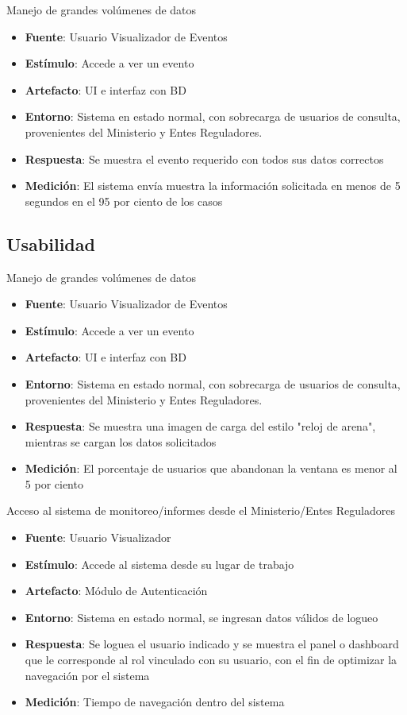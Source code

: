 Manejo de grandes volúmenes de datos
\begin{itemize}
\item {\bf Fuente}: Usuario Visualizador de Eventos
\item {\bf Estímulo}: Accede a ver un evento
\item {\bf Artefacto}: UI e interfaz con BD
\item {\bf Entorno}: Sistema en estado normal, con sobrecarga de usuarios de consulta, provenientes del Ministerio y Entes Reguladores.
\item {\bf Respuesta}: Se muestra el evento requerido con todos sus datos correctos
\item {\bf Medición}: El sistema envía muestra la información solicitada en menos de 5 segundos en el 95 por ciento de los casos
\end{itemize}

\subsection{Usabilidad}

Manejo de grandes volúmenes de datos
\begin{itemize}
\item {\bf Fuente}: Usuario Visualizador de Eventos
\item {\bf Estímulo}: Accede a ver un evento
\item {\bf Artefacto}: UI e interfaz con BD
\item {\bf Entorno}: Sistema en estado normal, con sobrecarga de usuarios de consulta, provenientes del Ministerio y Entes Reguladores.
\item {\bf Respuesta}: Se muestra una imagen de carga del estilo "reloj de arena", mientras se cargan los datos solicitados
\item {\bf Medición}: El porcentaje de usuarios que abandonan la ventana es menor al 5 por ciento
\end{itemize}

Acceso al sistema de monitoreo/informes desde el Ministerio/Entes Reguladores
\begin{itemize}
\item {\bf Fuente}: Usuario Visualizador
\item {\bf Estímulo}: Accede al sistema desde su lugar de trabajo
\item {\bf Artefacto}: Módulo de Autenticación
\item {\bf Entorno}: Sistema en estado normal, se ingresan datos válidos de logueo
\item {\bf Respuesta}: Se loguea el usuario indicado y se muestra el panel o dashboard que le corresponde al rol vinculado con su usuario, con el fin de optimizar la navegación por el sistema 
\item {\bf Medición}: Tiempo de navegación dentro del sistema
\end{itemize}

